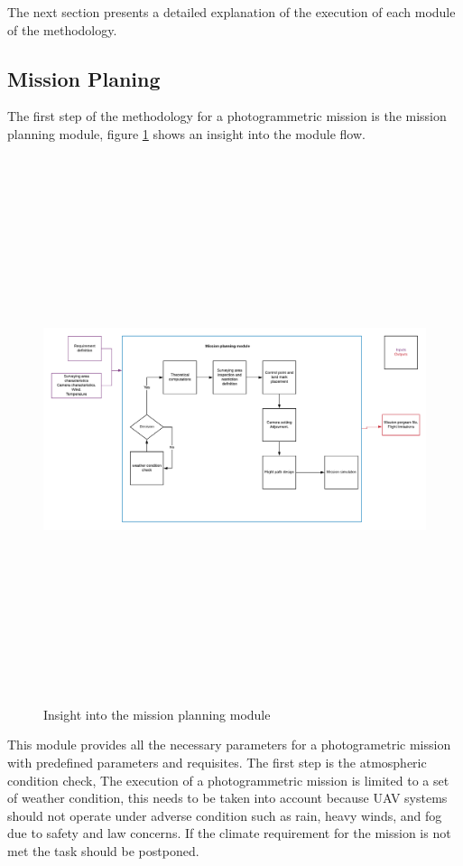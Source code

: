 The next section presents a detailed explanation of the execution of each module of the methodology.
\subsection{Mission Planing}
The first step of the methodology for a photogrammetric mission is the mission planning module, figure \ref{fig:MissionModule} shows an insight into the module flow.
\begin{figure}[H]
\centering
\includegraphics[width=16cm,height=16cm,keepaspectratio]{imagenes/Missionplanning.png}
\caption{Insight into the mission planning module}
\label{fig:MissionModule}
\end{figure}
This module provides all the necessary parameters for a photogrametric mission  with predefined parameters and requisites. The first step is the atmospheric condition check, The execution of a photogrammetric mission is limited to a set of weather condition, this needs to be taken into account because UAV systems should not operate under adverse condition such as rain, heavy winds, and fog due to safety and law concerns. If the climate requirement for the mission is not met the task should be postponed.

